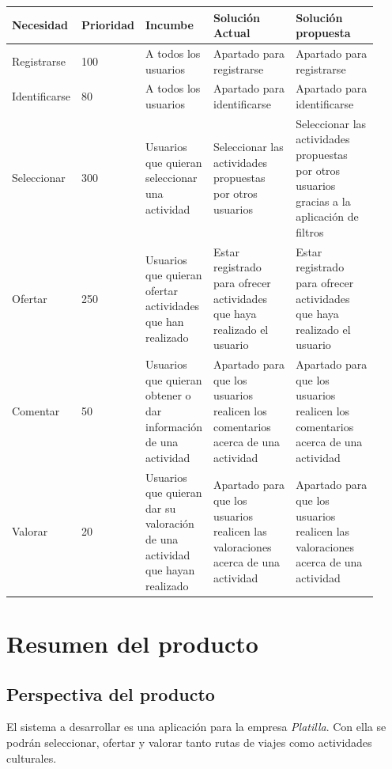 \documentclass[11pt]{article}
\begin{document}
\begin{table}[H]
  \centering
  \begin{tabular}{p{0.15\linewidth}p{0.12\linewidth}p{0.15\linewidth}p{0.25\linewidth}p{0.25\linewidth}}
    \toprule
    \textbf{Necesidad} & \textbf{Prioridad} & \textbf{Incumbe} & \textbf{Solución Actual} & \textbf{Solución propuesta} \\
    \midrule
    Registrarse & 100 & A todos los usuarios & Apartado para registrarse & Apartado para registrarse\\
    Identificarse & 80 & A todos los usuarios & Apartado para identificarse & Apartado para identificarse\\
    Seleccionar & 300 & Usuarios que quieran seleccionar una actividad & Seleccionar las actividades propuestas por otros usuarios & Seleccionar las actividades propuestas por otros usuarios gracias a la aplicación de filtros\\
    Ofertar & 250 & Usuarios que quieran ofertar actividades que han realizado & Estar registrado para ofrecer actividades que haya realizado el usuario & Estar registrado para ofrecer actividades que haya realizado el usuario\\
    Comentar & 50 & Usuarios que quieran obtener o dar información de una actividad & Apartado para que los usuarios realicen los comentarios acerca de una actividad & Apartado para que los usuarios realicen los comentarios acerca de una actividad\\
    Valorar & 20 & Usuarios que quieran dar su valoración de una actividad que hayan realizado & Apartado para que los usuarios realicen las valoraciones acerca de una actividad & Apartado para que los usuarios realicen las valoraciones acerca de una actividad \\
    
    \bottomrule
  \end{tabular}
\end{table}
\newpage


\section{Resumen del producto}\label{4}
\subsection{Perspectiva del producto}
El sistema a desarrollar es una aplicación para la empresa \textit{Platilla}. Con ella se podrán seleccionar, ofertar y valorar tanto rutas de viajes como actividades culturales.
\end{document}
